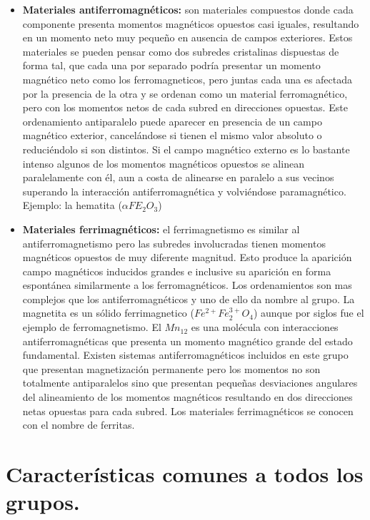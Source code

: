 \begin{itemize}
	\item \textbf{Materiales antiferromagnéticos:}
son materiales compuestos donde cada componente presenta momentos magnéticos opuestos casi iguales, resultando en un momento neto muy pequeño en ausencia de campos exteriores. Estos materiales se pueden pensar como dos subredes cristalinas dispuestas de forma tal, que cada una por separado podría presentar un momento magnético neto como los ferromagneticos, pero juntas cada una es afectada por la presencia de la otra y se ordenan como un material ferromagnético, pero con los momentos netos de cada subred en direcciones opuestas. Este ordenamiento antiparalelo puede aparecer en presencia de un campo magnético exterior, cancelándose si tienen el mismo valor absoluto o reduciéndolo si son distintos. Si el campo magnético externo es lo bastante intenso algunos de los momentos magnéticos opuestos se alinean paralelamente con él, aun a costa de alinearse en paralelo a sus vecinos superando la interacción antiferromagnética y volviéndose paramagnético. Ejemplo: la hematita ($\alpha FE_{2}O_{3}$)

	\item \textbf{Materiales ferrimagnéticos:}
el ferrimagnetismo es similar al antiferromagnetismo pero las subredes involucradas tienen momentos magnéticos opuestos de muy diferente magnitud. Esto produce la aparición campo magnéticos inducidos grandes e inclusive su aparición en forma espontánea similarmente a los ferromagnéticos. Los ordenamientos son mas complejos que los antiferromagnéticos y uno de ello da nombre al grupo. La magnetita es un sólido ferrimagnetico ($Fe^{2+}Fe^{3+}_{2}O_{4}$) aunque por siglos fue el ejemplo de ferromagnetismo. El $Mn_{12}$ es una molécula con interacciones antiferromagnéticas que presenta un momento magnético grande del estado fundamental. Existen sistemas antiferromagnéticos incluidos en este grupo que presentan magnetización permanente pero los momentos no son totalmente antiparalelos sino que presentan pequeñas desviaciones angulares del alineamiento de los momentos magnéticos resultando en dos direcciones netas opuestas para cada subred. Los materiales ferrimagnéticos se conocen con el nombre de ferritas.

\end{itemize}

\section{Características comunes a todos los grupos.}

